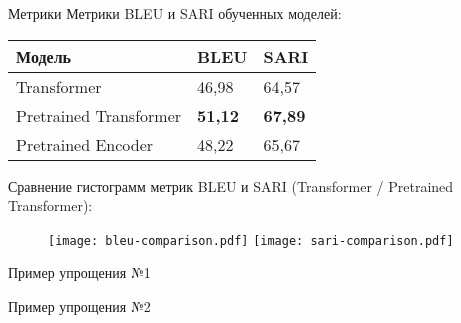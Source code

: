 \begin{frame}[fragile]{Метрики}%
  Метрики BLEU и SARI обученных моделей:
  \begin{table}[H]
    \centering\small
    \label{metrics}
      \begin{tabular}{|l|l|l|}
        \hline
        \textbf{Модель} & \textbf{BLEU} & \textbf{SARI} \\ \hline
        Transformer & 46{,}98 & 64{,}57 \\ \hline
        Pretrained Transformer & \textbf{51{,}12} & \textbf{67{,}89} \\ \hline
        Pretrained Encoder & 48{,}22 & 65{,}67 \\ \hline
      \end{tabular}
      \normalsize
  \end{table}
  Сравнение гистограмм метрик BLEU и SARI ({\color{mathematicaYellow}Transformer} / {\color{mathematicaBlue}Pretrained Transformer}):
  \begin{figure}[H]%
    \centering%
    \label{metrics-comparison}
      \texttt{[image: bleu-comparison.pdf]}
      \texttt{[image: sari-comparison.pdf]}
  \end{figure}%
\end{frame}


\begin{frame}[fragile]{Пример упрощения №1}%


\end{frame}


\begin{frame}[fragile]{Пример упрощения №2}%


\end{frame}


